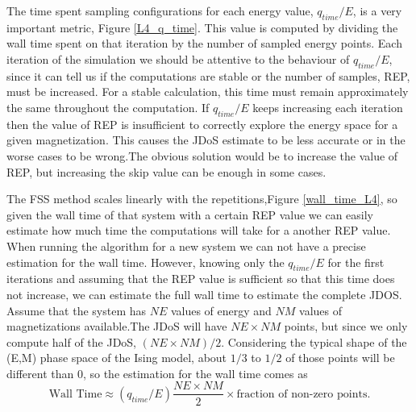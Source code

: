 	The time spent sampling configurations for each energy value, $q_{time}/E$, is a very important metric, Figure \ref{L4_q_time}. This value is computed by dividing the wall time spent on that iteration by the number of sampled energy points. Each iteration of the simulation we should be attentive to the behaviour of $q_{time}/E$, since it can tell us if the computations are stable or the number of samples, REP, must be increased. 
For a stable calculation, this time must remain approximately the same throughout the computation. If $q_{time}/E$ keeps increasing each iteration then the value of REP is insufficient to correctly explore the energy space for a given magnetization. This causes the JDoS estimate to be less accurate or in the worse cases to be wrong.The obvious solution would be to increase the value of REP, but increasing the skip value can be enough in some cases.

	The FSS method scales linearly with the repetitions,Figure \ref{wall_time_L4}, so given the wall time of that system with a certain REP value we can easily estimate how much time the computations will take for a another REP value.
When running the algorithm for a new system we can not have a precise estimation for the wall time. However, knowing only the $q_{time}/E$ for the first iterations and assuming that the REP value is sufficient so that this time does not increase, we can estimate the full wall time to estimate the complete JDOS. Assume that the system has $NE$ values of energy and $NM$ values of magnetizations available.The JDoS will have $NE \times NM$ points, but since we only compute half of the JDoS, $( NE \times NM ) / 2$. Considering the typical shape of the (E,M) phase space of the Ising model, about $1/3$ to $1/2$ of those points will be different than 0, so the estimation for the wall time comes as 
\begin{equation}\label{estimation}
	\text{Wall Time} \approx (q_{time}/E) \frac{NE \times NM}{2} \times \text{fraction of non-zero points} .
\end{equation}

\pagebreak

